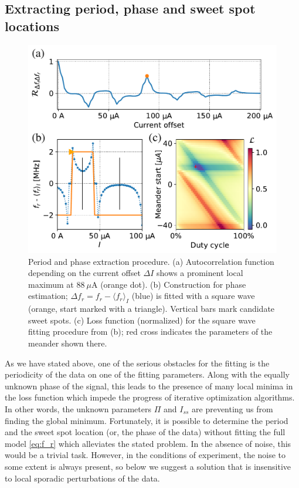 \documentclass[%
 aip,
 draft,
 amsmath,amssymb,
 reprint,%
]{revtex4-1}
\begin{document}
\subsection{Extracting period, phase and sweet spot locations}
\begin{figure}
\centering
\includegraphics[width=\linewidth]{per+phase}
\caption{Period and phase extraction procedure. (a) Autocorrelation function depending on the current offset $\Delta I$ shows a prominent local maximum at $88\ \mu$A (orange dot). (b) Construction for phase estimation; $\Delta f_r = f_r-\langle f_r \rangle_{I}$ (blue) is fitted with a square wave (orange, start marked with a triangle). Vertical bars mark candidate sweet spots. (c) Loss function (normalized) for the square wave fitting procedure from (b); red cross indicates the parameters of the meander shown there.}
\label{fig:per+phase}
\end{figure}
As we have stated above, one of the serious obstacles for the fitting is the periodicity of the data on one of the fitting parameters. Along with the equally unknown phase of the signal, this leads to the presence of many local minima in the loss function which impede the progress of iterative optimization algorithms. In other words, the unknown parameters $\Pi$ and $I_{ss}$ are preventing us from finding the global minimum. Fortunately, it is possible to determine the period and the sweet spot location (or, the phase of the data) without fitting the full model \eqref{eq:f_r} which alleviates the stated problem. In the absence of noise, this would be a trivial task. However, in the conditions of experiment, the noise to some extent is always present, so below we suggest a solution that is insensitive to local sporadic perturbations of the data.
\end{document}
